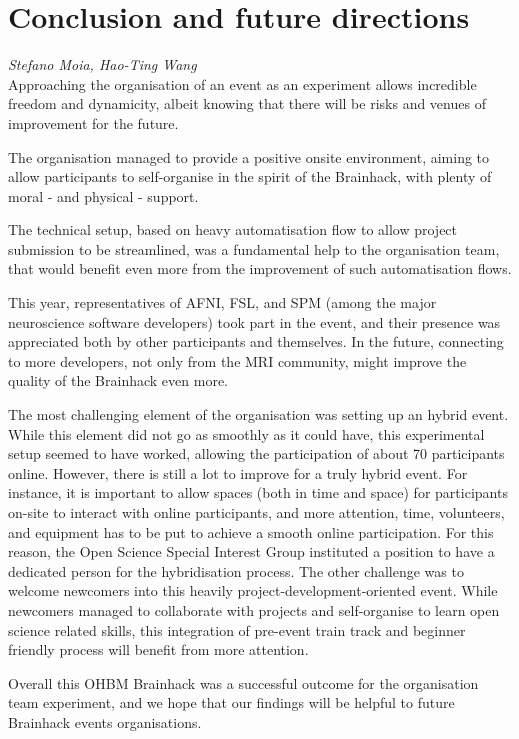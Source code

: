 \documentclass[12pt,a4paper,onecolumn]{article}
\let\Oldsection\section
\renewcommand{\section}{\FloatBarrier\Oldsection}
\newcommand{\authors}[1]{\emph{\scriptsize #1} \\}
\begin{document}








\vfill\eject
\columnbreak








\section{Conclusion and future directions}
\authors{Stefano Moia, %
Hao-Ting Wang}
%

Approaching the organisation of an event as an experiment allows
incredible freedom and dynamicity, albeit knowing that there will be
risks and venues of improvement for the future.

The organisation managed to provide a positive onsite environment,
aiming to allow participants to self-organise in the spirit of the
Brainhack\supercite{Gau2021}, with plenty of moral - and physical - support.

The technical setup, based on heavy automatisation flow to allow project
submission to be streamlined, was a fundamental help to the organisation
team, that would benefit even more from the improvement of such
automatisation flows.

This year, representatives of AFNI, FSL, and SPM (among the major
neuroscience software developers) took part in the event, and their
presence was appreciated both by other participants and themselves. In
the future, connecting to more developers, not only from the MRI
community, might improve the quality of the Brainhack even more.

The most challenging element of the organisation was setting up an
hybrid event. While this element did not go as smoothly as it could
have, this experimental setup seemed to have worked, allowing the
participation of about 70 participants online. However, there is still a
lot to improve for a truly hybrid event. For instance, it is important
to allow spaces (both in time and space) for participants on-site to
interact with online participants, and more attention, time, volunteers,
and equipment has to be put to achieve a smooth online participation.
For this reason, the Open Science Special Interest Group instituted a
position to have a dedicated person for the hybridisation process. The
other challenge was to welcome newcomers into this heavily
project-development-oriented event. While newcomers managed to
collaborate with projects and self-organise to learn open science
related skills, this integration of pre-event train track and beginner
friendly process will benefit from more attention.

Overall this OHBM Brainhack was a successful outcome for the organisation
team experiment, and we hope that our findings will be helpful to future
Brainhack events organisations.

\printbibliography
\end{document}
